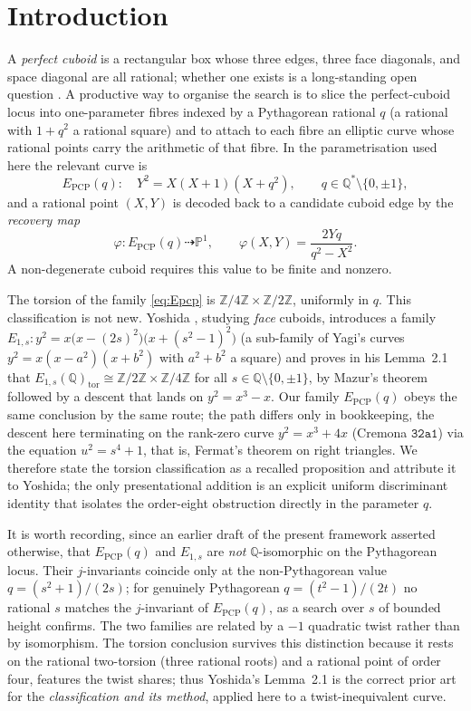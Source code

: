 \documentclass[11pt,reqno]{amsart}
\theoremstyle{plain}
\theoremstyle{definition}
\newcommand{\Q}{\mathbb{Q}}
\newcommand{\Z}{\mathbb{Z}}
\newcommand{\Pone}{\mathbb{P}^{1}}
\newcommand{\Epcp}{E_{\mathrm{PCP}}}
\begin{document}
\section{Introduction}

A \emph{perfect cuboid} is a rectangular box whose three edges, three face diagonals,
and space diagonal are all rational; whether one exists is a long-standing open
question \cite{Guy}. A productive way to organise the search is to slice the
perfect-cuboid locus into one-parameter fibres indexed by a Pythagorean rational $q$
(a rational with $1+q^{2}$ a rational square) and to attach to each fibre an elliptic
curve whose rational points carry the arithmetic of that fibre. In the parametrisation
used here the relevant curve is
\begin{equation}\label{eq:Epcp}
\Epcp(q)\colon\quad Y^{2}=X(X+1)(X+q^{2}),\qquad q\in\Q^{\ast}\setminus\{0,\pm1\},
\end{equation}
and a rational point $(X,Y)$ is decoded back to a candidate cuboid edge by the
\emph{recovery map}
\begin{equation}\label{eq:phi}
\varphi\colon \Epcp(q)\dashrightarrow\Pone,\qquad
\varphi(X,Y)=\frac{2Yq}{q^{2}-X^{2}}.
\end{equation}
A non-degenerate cuboid requires this value to be finite and nonzero.

The torsion of the family \eqref{eq:Epcp} is $\Z/4\Z\times\Z/2\Z$, uniformly in $q$.
This classification is not new. Yoshida \cite{Yoshida}, studying \emph{face} cuboids,
introduces a family $E_{1,s}\colon y^{2}=x\bigl(x-(2s)^{2}\bigr)\bigl(x+(s^{2}-1)^{2}\bigr)$
(a sub-family of Yagi's curves $y^{2}=x(x-a^{2})(x+b^{2})$ with $a^{2}+b^{2}$ a square)
and proves in his Lemma~2.1 that $E_{1,s}(\Q)_{\mathrm{tor}}\cong\Z/2\Z\times\Z/4\Z$ for
all $s\in\Q\setminus\{0,\pm1\}$, by Mazur's theorem followed by a descent that lands on
$y^{2}=x^{3}-x$. Our family $\Epcp(q)$ obeys the same conclusion by the same route;
the path differs only in bookkeeping, the descent here terminating on the
rank-zero curve $y^{2}=x^{3}+4x$ (Cremona $\mathtt{32a1}$) via the equation
$u^{2}=s^{4}+1$, that is, Fermat's theorem on right triangles. We therefore state the
torsion classification as a recalled proposition and attribute it to Yoshida; the only
presentational addition is an explicit uniform discriminant identity that isolates the
order-eight obstruction directly in the parameter $q$.

It is worth recording, since an earlier draft of the present framework asserted
otherwise, that $\Epcp(q)$ and $E_{1,s}$ are \emph{not} $\Q$-isomorphic on the
Pythagorean locus. Their $j$-invariants coincide only at the non-Pythagorean value
$q=(s^{2}+1)/(2s)$; for genuinely Pythagorean $q=(t^{2}-1)/(2t)$ no rational $s$ matches
the $j$-invariant of $\Epcp(q)$, as a search over $s$ of bounded height confirms. The
two families are related by a $-1$ quadratic twist rather than by isomorphism. The
torsion conclusion survives this distinction because it rests on the rational
two-torsion (three rational roots) and a rational point of order four, features the
twist shares; thus Yoshida's Lemma~2.1 is the correct prior art for the
\emph{classification and its method}, applied here to a twist-inequivalent curve.
\end{document}
